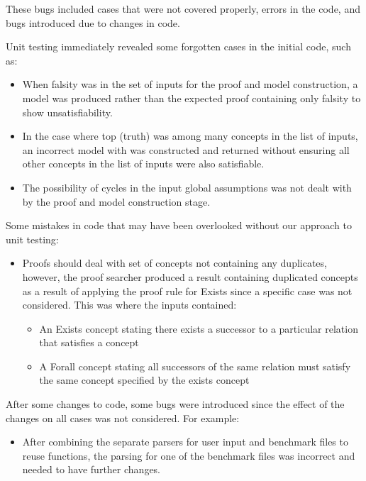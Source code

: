 These bugs included cases that were not covered properly, errors in the code, and bugs introduced due to changes in code.

Unit testing immediately revealed some forgotten cases in the initial code, such as:

\begin{itemize}
\item When falsity was in the set of inputs for the proof and model construction, a model was produced rather than the expected proof containing only falsity to show unsatisfiability.
\item In the case where top (truth) was among many concepts in the list of inputs, an incorrect model with was constructed and returned without ensuring all other concepts in the list of inputs were also satisfiable.
\item The possibility of cycles in the input global assumptions was not dealt with by the proof and model construction stage.
\end{itemize}

Some mistakes in code that may have been overlooked without our approach to unit testing:

\begin{itemize}
\item Proofs should deal with set of concepts not containing any duplicates, however, the proof searcher produced a result containing duplicated concepts as a result of applying the proof rule for Exists since a specific case was not considered. This was where the inputs contained:
\begin{itemize}
\item An Exists concept stating there exists a successor to a particular relation that satisfies a concept
\item A Forall concept stating all successors of the same relation must satisfy the same concept specified by the exists concept
\end{itemize}
\end{itemize}

After some changes to code, some bugs were introduced since the effect of the changes on all cases was not considered. For example:

\begin{itemize}
\item After combining the separate parsers for user input and benchmark files to reuse functions, the parsing for one of the benchmark files was incorrect and needed to have further changes.
\end{itemize}

